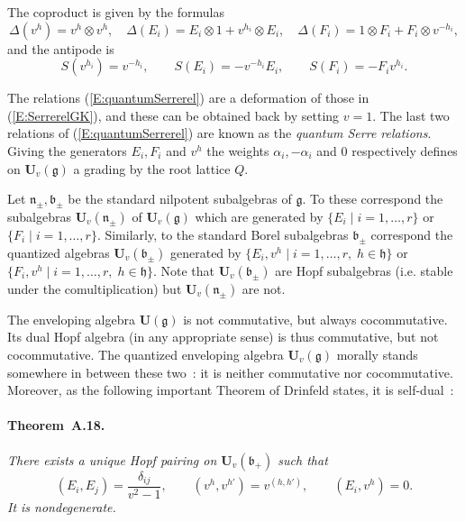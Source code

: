 \documentclass[a4paper,10pt]{amsart}
\def\U{\mathbf{U}}
\def\a{\alpha}
\def\g{\mathfrak{g}}
\def\bo{\mathfrak{b}}
\def\h{\mathfrak{h}}
\def\n{\mathfrak{n}}
\numberwithin{equation}{section}
\begin{document}
{\vspace{.05in}

\noindent
The coproduct is given by the formulas
$$\Delta(v^h)=v^h \otimes v^h, \quad \Delta(E_i)=E_i \otimes 1 + v^{h_i} \otimes E_i, \quad \Delta(F_i)=1\otimes F_i + F_i \otimes v^{-h_i} ,$$
and the antipode is
$$S(v^{h_i})=v^{-h_i}, \qquad S(E_i)=-v^{-h_i}E_i, \qquad S(F_i)=-F_iv^{h_i}.$$

\vspace{.1in}

\noindent
The relations (\ref{E:quantumSerrerel}) are a deformation of those in (\ref{E:SerrerelGK}), and these can be obtained back by setting $v=1$. The last two relations of (\ref{E:quantumSerrerel}) are known as the \textit{quantum Serre relations}. Giving the generators $E_i, F_i$ and $v^h$ the weights $\a_i, -\a_i$ and $0$ respectively defines on $\U_v(\g)$ a grading by the root lattice $Q$.

\vspace{.1in}

Let $\n_{\pm}, \bo_{\pm}$ be the standard nilpotent subalgebras of $\g$. To these correspond
the subalgebras $\U_v(\n_{\pm})$  of $\U_v(\g)$ which are generated by
$\{E_i\;|\; i =1, \ldots, r\}$ or $\{F_i\;|\; i =1, \ldots, r\}$. Similarly, to the standard Borel subalgebras $\bo_{\pm}$ correspond the quantized algebras $\U_v(\bo_{\pm})$ generated by $\{E_i, v^h\;|\; i =1, \ldots, r, \;h \in \h\}$ or $\{F_i, v^h\;|\; i =1, \ldots, r, \;h \in \h\}$. Note that $\U_v(\bo_{\pm})$ are Hopf subalgebras (i.e. stable under the comultiplication) but $\U_v(\n_{\pm})$ are not.

\vspace{.2in}

The enveloping algebra $\U(\g)$ is not commutative, but always cocommutative. Its dual Hopf algebra (in any appropriate sense) is thus commutative, but not cocommutative. The quantized enveloping algebra $\U_v(\g)$ morally stands somewhere in between these two~: it is neither commutative nor cocommutative. Moreover, as the following important Theorem of Drinfeld states, it is self-dual~:

\vspace{.1in}

\paragraph{\textbf{Theorem~A.18.}} \textit{There exists a unique Hopf pairing on $\U_v(\bo_+)$ such that}
$$ (E_i,E_j)=\frac{\delta_{ij}}{v^2-1}, \qquad (v^h,v^{h'})=v^{(h,h')}, \qquad (E_i, v^h)=0.$$
\textit{It is nondegenerate.}

}
\end{document}
